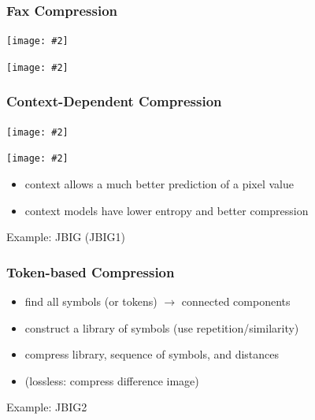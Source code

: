\documentclass{beamer}
\def\ra{$\rightarrow$ }
\newcommand{\ig}[2]{\texttt{[image: \#2]}}
\newcommand{\igc}[2]{\centerline{\texttt{[image: \#2]}}}
\begin{document}
\begin{frame}
  \frametitle{Fax Compression}

\centerline{
\ig{0.7}{rle}
}

\centerline{
\ig{0.9}{fig8-14}
}


\end{frame}


\begin{frame}
  \frametitle{Context-Dependent Compression}


\igc{0.25}{context1}

\igc{0.7}{contexts}

\begin{itemize}
\item context allows a much better prediction of a pixel value
\item context models have lower entropy and better compression
\end{itemize}
Example: JBIG (JBIG1)

\end{frame}


\begin{frame}
  \frametitle{Token-based Compression}

  \begin{itemize}
  \item find all symbols (or tokens) \ra connected components
  \item construct a library of symbols (use repetition/similarity)
  \item compress library, sequence of symbols, and distances
  \item (lossless: compress difference image)
  \end{itemize}

Example: JBIG2

\end{frame}
\end{document}
